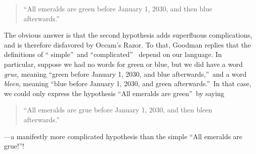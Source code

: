 \documentclass[12pt,onecolumn]{article}%
\begin{document}
\begin{quotation}
\noindent\textquotedblleft All emeralds are green before January 1, 2030, and
then blue afterwards.\textquotedblright\ 
\end{quotation}

The obvious answer is that the second hypothesis adds superfluous
complications, and is therefore disfavored by Occam's Razor. To that,
Goodman replies that the definitions of \textquotedblleft
simple\textquotedblright\  and \textquotedblleft complicated\textquotedblright\ %
 depend on our language. In particular, suppose we had no words for green
or blue, but we did have a word \textit{grue}, meaning \textquotedblleft green
before January 1, 2030, and blue afterwards,\textquotedblright\  and a word
\textit{bleen}, meaning \textquotedblleft blue before January 1, 2030, and
green afterwards.\textquotedblright\  In that case, we could only express the
hypothesis \textquotedblleft All emeralds are green\textquotedblright\  by saying

\begin{quotation}
\noindent\textquotedblleft All emeralds are grue before January 1, 2030, and
then bleen afterwards.\textquotedblright\ 
\end{quotation}

\noindent---a manifestly more complicated hypothesis than the simple
\textquotedblleft All emeralds are grue!\textquotedblright !
\end{document}

